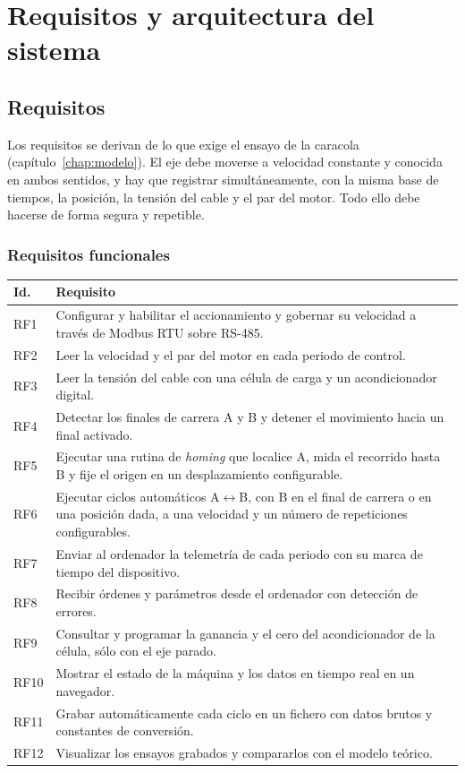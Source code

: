 \chapter{Requisitos y arquitectura del sistema}
\label{chap:arquitectura}

\section{Requisitos}

Los requisitos se derivan de lo que exige el ensayo de la caracola (capítulo~\ref{chap:modelo}).
El eje debe moverse a velocidad constante y conocida en ambos sentidos, y hay que registrar
simultáneamente, con la misma base de tiempos, la posición, la tensión del cable y el par del
motor. Todo ello debe hacerse de forma segura y repetible.

\subsection{Requisitos funcionales}

\begin{longtable}{@{}L{0.09\textwidth}L{0.85\textwidth}@{}}
\toprule
\textbf{Id.} & \textbf{Requisito} \\
\midrule
\endhead
RF1 & Configurar y habilitar el accionamiento y gobernar su velocidad a través de Modbus RTU sobre RS-485. \\
RF2 & Leer la velocidad y el par del motor en cada periodo de control. \\
RF3 & Leer la tensión del cable con una célula de carga y un acondicionador digital. \\
RF4 & Detectar los finales de carrera A y B y detener el movimiento hacia un final activado. \\
RF5 & Ejecutar una rutina de \emph{homing} que localice A, mida el recorrido hasta B y fije el origen en un desplazamiento configurable. \\
RF6 & Ejecutar ciclos automáticos A$\leftrightarrow$B, con B en el final de carrera o en una posición dada, a una velocidad y un número de repeticiones configurables. \\
RF7 & Enviar al ordenador la telemetría de cada periodo con su marca de tiempo del dispositivo. \\
RF8 & Recibir órdenes y parámetros desde el ordenador con detección de errores. \\
RF9 & Consultar y programar la ganancia y el cero del acondicionador de la célula, sólo con el eje parado. \\
RF10 & Mostrar el estado de la máquina y los datos en tiempo real en un navegador. \\
RF11 & Grabar automáticamente cada ciclo en un fichero con datos brutos y constantes de conversión. \\
RF12 & Visualizar los ensayos grabados y compararlos con el modelo teórico. \\
\bottomrule
\end{longtable}

